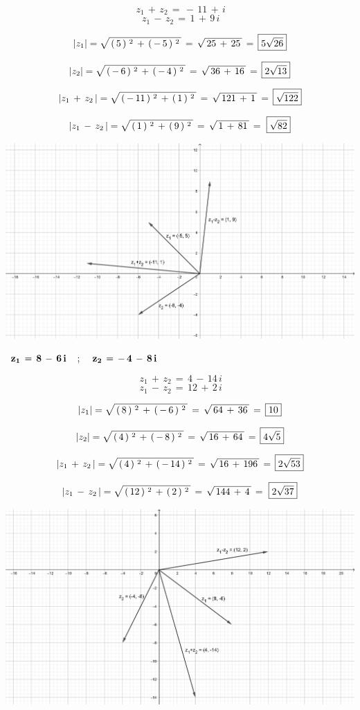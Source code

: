 \documentclass[a4paper,11pt,openany]{book}
\begin{document}
$$\,{z_1}\,+\,{z_2}\,=\,-\,11\,+\,i$$
$$\,{z_1}\,-\,{z_2}\,=\,1\,+\,9\,i$$

$$\lvert z_1\rvert = \sqrt{\,(\,5\,)\,^{\,2}\,+\,(\,-\,5\,)\,^{\,2}\,}\,=\,\sqrt{\,25\,+\,25\,}\,=\,\boxed{5\sqrt{26}}$$

$$\lvert z_2\rvert = \sqrt{\,(\,-\,6\,)\,^{\,2}\,+\,(\,-\,4\,)\,^{\,2}\,}\,=\,\sqrt{\,36\,+\,16\,}\,=\,\boxed{2\sqrt{13}}$$

$$\lvert z_1\,+\,{z_2}\,\rvert = \sqrt{\,(\,-\,11\,)\,^{\,2}\,+\,(\,1\,)\,^{\,2}\,}\,=\,\sqrt{\,121\,+\,1\,}\,=\,\boxed{\sqrt{122}}$$

$$\lvert z_1\,-\,{z_2}\,\rvert = \sqrt{\,(\,1\,)\,^{\,2}\,+\,(\,9\,)\,^{\,2}\,}\,=\,\sqrt{\,1\,+\,81\,}\,=\,\,\boxed{\sqrt{82}}$$

\includegraphics[width=15cm]{geo2}

\textcolor{ao(english)}{}\,\quad\,$\bf{z_{1}\,=\,8\,-\,6\,i \quad\,;\,\quad z_{2}\,=\,-\,4\,-\,8\,i}$

$$\,{z_1}\,+\,{z_2}\,=\,4\,-\,14\,i$$
$$\,{z_1}\,-\,{z_2}\,=\,12\,+\,2\,i$$

$$\lvert z_1\rvert = \sqrt{\,(\,8\,)\,^{\,2}\,+\,(\,-\,6\,)\,^{\,2}\,}\,=\,\sqrt{\,64\,+\,36\,}\,=\,\boxed{10}$$

$$\lvert z_2\rvert = \sqrt{\,(\,4\,)\,^{\,2}\,+\,(\,-\,8\,)\,^{\,2}\,}\,=\,\sqrt{\,16\,+\,64\,}\,=\,\boxed{4\sqrt{5}}$$

$$\lvert z_1\,+\,{z_2}\,\rvert = \sqrt{\,(\,4\,)\,^{\,2}\,+\,(\,-\,14\,)\,^{\,2}\,}\,=\,\sqrt{\,16\,+\,196\,}\,=\,\boxed{2\sqrt{53}}$$

$$\lvert z_1\,-\,{z_2}\,\rvert = \sqrt{\,(\,12\,)\,^{\,2}\,+\,(\,2\,)\,^{\,2}\,}\,=\,\sqrt{\,144\,+\,4\,}\,=\,\,\boxed{2\sqrt{37}}$$

\includegraphics[width=15cm]{geo3}
\end{document}
